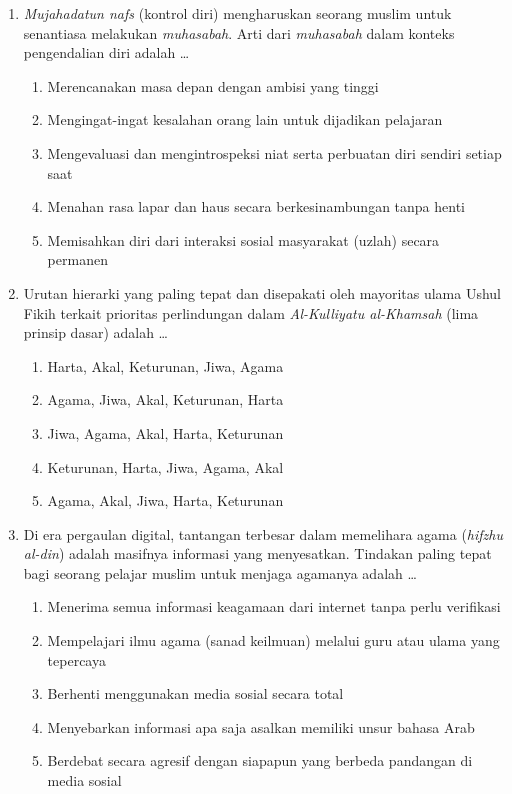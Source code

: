\documentclass[12pt,a4paper]{article}
\begin{document}
\begin{enumerate}[leftmargin=*]
\item \textit{Mujahadatun nafs} (kontrol diri) mengharuskan seorang muslim untuk senantiasa melakukan \textit{muhasabah}. Arti dari \textit{muhasabah} dalam konteks pengendalian diri adalah \dots
    \begin{enumerate}[label=\alph*.]
        \item Merencanakan masa depan dengan ambisi yang tinggi
        \item Mengingat-ingat kesalahan orang lain untuk dijadikan pelajaran
        \item Mengevaluasi dan mengintrospeksi niat serta perbuatan diri sendiri setiap saat
        \item Menahan rasa lapar dan haus secara berkesinambungan tanpa henti
        \item Memisahkan diri dari interaksi sosial masyarakat (uzlah) secara permanen
    \end{enumerate}

\item Urutan hierarki yang paling tepat dan disepakati oleh mayoritas ulama Ushul Fikih terkait prioritas perlindungan dalam \textit{Al-Kulliyatu al-Khamsah} (lima prinsip dasar) adalah \dots
    \begin{enumerate}[label=\alph*.]
        \item Harta, Akal, Keturunan, Jiwa, Agama
        \item Agama, Jiwa, Akal, Keturunan, Harta
        \item Jiwa, Agama, Akal, Harta, Keturunan
        \item Keturunan, Harta, Jiwa, Agama, Akal
        \item Agama, Akal, Jiwa, Harta, Keturunan
    \end{enumerate}

\item Di era pergaulan digital, tantangan terbesar dalam memelihara agama (\textit{hifzhu al-din}) adalah masifnya informasi yang menyesatkan. Tindakan paling tepat bagi seorang pelajar muslim untuk menjaga agamanya adalah \dots
    \begin{enumerate}[label=\alph*.]
        \item Menerima semua informasi keagamaan dari internet tanpa perlu verifikasi
        \item Mempelajari ilmu agama (sanad keilmuan) melalui guru atau ulama yang tepercaya
        \item Berhenti menggunakan media sosial secara total
        \item Menyebarkan informasi apa saja asalkan memiliki unsur bahasa Arab
        \item Berdebat secara agresif dengan siapapun yang berbeda pandangan di media sosial
    \end{enumerate}


\end{enumerate}
\end{document}
